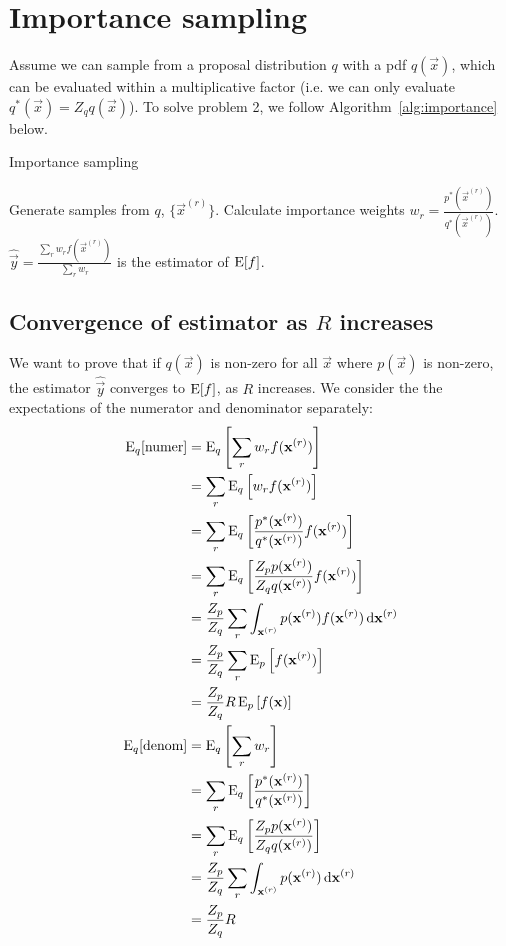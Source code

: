 \section{Importance sampling}

Assume we can sample from a proposal distribution $q$ with a pdf $q(\vec x)$, which can be evaluated within a multiplicative factor (i.e. we can only evaluate $q^\ast(\vec x) = Z_q q(\vec x)$). To solve problem 2, we follow Algorithm~\ref{alg:importance} below.
\begin{algorithm}
\caption{Importance sampling}\label{alg:importance}
    \begin{algorithmic}[1]
        \State Generate samples from $q$, $\{\vec x^{(r)}\}$.
        \State Calculate importance weights $w_r = \frac{p^\ast(\vec x^{(r)})}{q^\ast(\vec x^{(r)})}$.
        \State $\hat{\vec y} = \frac{\sum_r w_r f(\vec x^{(r)})}{\sum_r w_r}$ is the estimator of $\operatorname{\mathrm{E}}[f]$.
    \end{algorithmic}
\end{algorithm}

\subsection{Convergence of estimator as $R$ increases}
    We want to prove that if $q(\vec x)$ is non-zero for all $\vec x$ where $p(\vec x)$ is non-zero, the estimator $\hat{\vec y}$ converges to $\operatorname{\mathrm{E}}[f]$, as $R$ increases. We consider the the expectations of the numerator and denominator separately:
    \begin{align}
        \operatorname{\mathrm{E}}_q[\text{numer}]  &= \operatorname{\mathrm{E}}_q\left[\sum_r w_r f(\boldsymbol{\mathbf{x}}^{(r)})\right] \\
                            &= \sum_r \operatorname{\mathrm{E}}_q\left[w_r f(\boldsymbol{\mathbf{x}}^{(r)})\right] \\
                            &= \sum_r \operatorname{\mathrm{E}}_q\left[\frac{p^\ast(\boldsymbol{\mathbf{x}}^{(r)})}{q^\ast(\boldsymbol{\mathbf{x}}^{(r)})} f(\boldsymbol{\mathbf{x}}^{(r)})\right] \\
                            &= \sum_r \operatorname{\mathrm{E}}_q\left[\frac{Z_p p(\boldsymbol{\mathbf{x}}^{(r)})}{Z_q q(\boldsymbol{\mathbf{x}}^{(r)})} f(\boldsymbol{\mathbf{x}}^{(r)})\right] \\
                            &= \frac{Z_p}{Z_q} \sum_r \int_{\boldsymbol{\mathbf{x}}^{(r)}} p(\boldsymbol{\mathbf{x}}^{(r)}) f(\boldsymbol{\mathbf{x}}^{(r)}) \, \mathrm d \boldsymbol{\mathbf{x}}^{(r)} \\
                            &= \frac{Z_p}{Z_q} \sum_r \operatorname{\mathrm{E}}_p\left[f(\boldsymbol{\mathbf{x}}^{(r)})\right] \\
                            &= \frac{Z_p}{Z_q} R \operatorname{\mathrm{E}}_p\left[f(\boldsymbol{\mathbf{x}})\right] \\
        \operatorname{\mathrm{E}}_q[\text{denom}]  &= \operatorname{\mathrm{E}}_q\left[\sum_r w_r\right] \\
                            &= \sum_r \operatorname{\mathrm{E}}_q\left[\frac{p^\ast(\boldsymbol{\mathbf{x}}^{(r)})}{q^\ast(\boldsymbol{\mathbf{x}}^{(r)})}\right] \\
                            &= \sum_r \operatorname{\mathrm{E}}_q\left[\frac{Z_p p(\boldsymbol{\mathbf{x}}^{(r)})}{Z_q q(\boldsymbol{\mathbf{x}}^{(r)})}\right] \\
                            &= \frac{Z_p}{Z_q} \sum_r \int_{\boldsymbol{\mathbf{x}}^{(r)}} p(\boldsymbol{\mathbf{x}}^{(r)}) \,\mathrm d \boldsymbol{\mathbf{x}}^{(r)} \\
                            &= \frac{Z_p}{Z_q} R
    \end{align}


